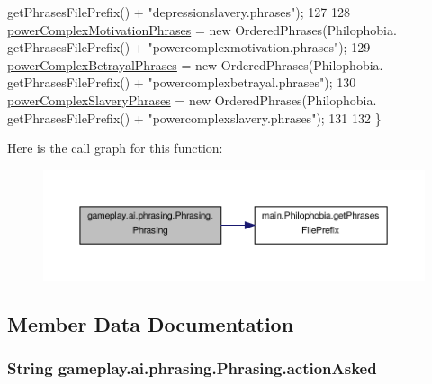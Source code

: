 \begin{DoxyCode}
      getPhrasesFilePrefix() + \textcolor{stringliteral}{"depressionslavery.phrases"});
127 
128         \hyperlink{classgameplay_1_1ai_1_1phrasing_1_1_phrasing_ad566ad78166872e95e920833f4f36e90}{powerComplexMotivationPhrases} = \textcolor{keyword}{new} OrderedPhrases(Philophobia.
      getPhrasesFilePrefix() + \textcolor{stringliteral}{"powercomplexmotivation.phrases"});
129         \hyperlink{classgameplay_1_1ai_1_1phrasing_1_1_phrasing_a77e67b74525c919463d3c9b830fe895d}{powerComplexBetrayalPhrases} = \textcolor{keyword}{new} OrderedPhrases(Philophobia.
      getPhrasesFilePrefix() + \textcolor{stringliteral}{"powercomplexbetrayal.phrases"});
130         \hyperlink{classgameplay_1_1ai_1_1phrasing_1_1_phrasing_afc6cf63da008d88b88e0e8138bb2fda9}{powerComplexSlaveryPhrases} = \textcolor{keyword}{new} OrderedPhrases(Philophobia.
      getPhrasesFilePrefix() + \textcolor{stringliteral}{"powercomplexslavery.phrases"});
131 
132     \}
\end{DoxyCode}


Here is the call graph for this function\-:
\nopagebreak
\begin{figure}[H]
\begin{center}
\leavevmode
\includegraphics[width=350pt]{classgameplay_1_1ai_1_1phrasing_1_1_phrasing_a369fb65d1e9363006fb8f4fa31b438de_cgraph}
\end{center}
\end{figure}




\subsection{Member Data Documentation}
\hypertarget{classgameplay_1_1ai_1_1phrasing_1_1_phrasing_a613e36f3cca02a5ff83401e2373effd9}{
\subsubsection[{action\-Asked}]{\setlength{\rightskip}{0pt plus 5cm}String gameplay.\-ai.\-phrasing.\-Phrasing.\-action\-Asked\hspace{0.3cm}{\ttfamily [protected]}}}\label{classgameplay_1_1ai_1_1phrasing_1_1_phrasing_a613e36f3cca02a5ff83401e2373effd9}


